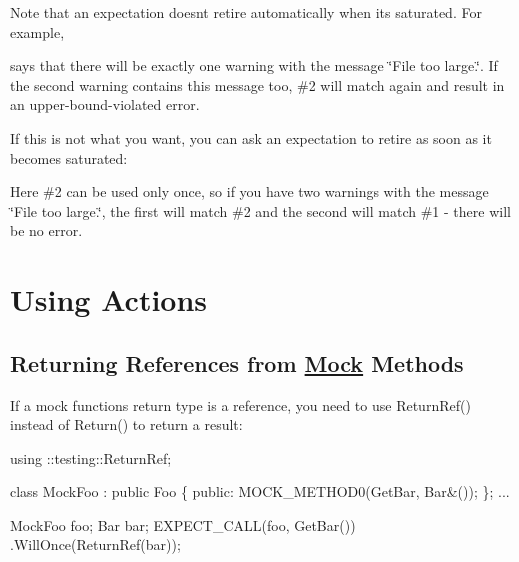 Note that an expectation doesn\textquotesingle{}t retire automatically when it\textquotesingle{}s saturated. For example,




says that there will be exactly one warning with the message {\ttfamily \char`\"{}\+File
too large.\char`\"{}}. If the second warning contains this message too, \#2 will match again and result in an upper-\/bound-\/violated error.

If this is not what you want, you can ask an expectation to retire as soon as it becomes saturated\+:




Here \#2 can be used only once, so if you have two warnings with the message {\ttfamily \char`\"{}\+File too large.\char`\"{}}, the first will match \#2 and the second will match \#1 -\/ there will be no error.

\section*{Using Actions}

\subsection*{Returning References from \hyperlink{class_mock}{Mock} Methods}

If a mock function\textquotesingle{}s return type is a reference, you need to use {\ttfamily Return\+Ref()} instead of {\ttfamily Return()} to return a result\+:


\begin{DoxyCode}
using ::testing::ReturnRef;

class MockFoo : public Foo \{
 public:
  MOCK\_METHOD0(GetBar, Bar&());
\};
...

  MockFoo foo;
  Bar bar;
  EXPECT\_CALL(foo, GetBar())
      .WillOnce(ReturnRef(bar));
\end{DoxyCode}


